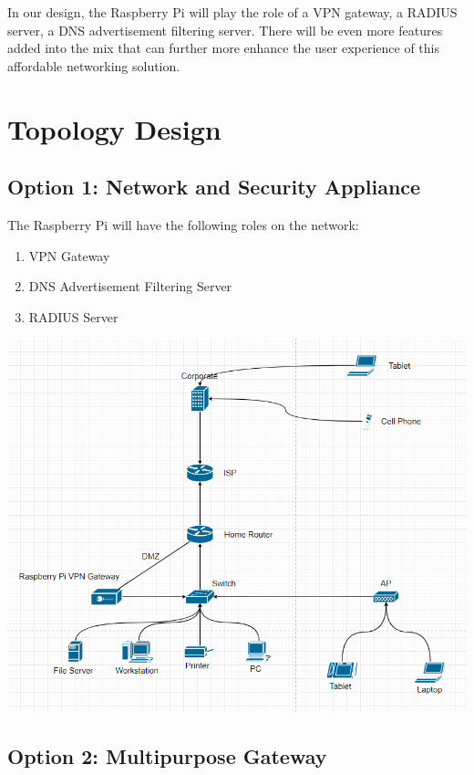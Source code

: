 \documentclass[12pt]{article}
\begin{document}
In our design, the Raspberry Pi will play the role of a VPN gateway, a RADIUS server, a DNS advertisement filtering server. There will be even more features added into the mix that can further more enhance the user experience of this affordable networking solution.

\vfill

\section{Topology Design}

\subsection{Option 1: Network and Security Appliance}

The Raspberry Pi will have the following roles on the network:

\begin{enumerate}
\item VPN Gateway
\item DNS Advertisement Filtering Server
\item RADIUS Server
\end{enumerate}

\begin{center}
\includegraphics[scale=0.6]{topology.png}\\[1cm]
\end{center}

\subsection{Option 2: Multipurpose Gateway}
\end{document}
